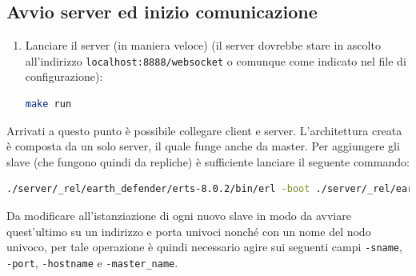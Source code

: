 \documentclass[paper=a4, fontsize=11pt]{scrartcl} %
\numberwithin{equation}{section} %
\numberwithin{figure}{section} %
\numberwithin{table}{section} %
\begin{document}
\subsection{Avvio server ed inizio comunicazione}
\begin{enumerate}
\item
Lanciare il server (in maniera veloce) (il server dovrebbe stare in ascolto all'indirizzo \texttt{localhost:8888/websocket} o comunque come indicato nel file di configurazione):
\begin{lstlisting}[language=bash]
make run
\end{lstlisting}
\end{enumerate}

Arrivati a questo punto è possibile collegare client e server.
L'architettura creata è composta da un solo server, il quale funge anche da master. Per aggiungere gli slave (che fungono quindi da repliche) è sufficiente
lanciare il seguente commando:
\begin{lstlisting}[language=bash]
./server/_rel/earth_defender/erts-8.0.2/bin/erl -boot ./server/_rel/earth_defender/releases/1.0.0/earth_defender -sname 'ketchup' -setcookie 'earth_defender' -port 8889 -hostname "localhost" -role slave -master_name earth_defender@host
\end{lstlisting}
Da modificare all'istanziazione di ogni nuovo slave in modo da avviare quest'ultimo su un indirizzo e porta univoci nonché con un nome del nodo univoco, per tale operazione è quindi necessario agire sui seguenti campi \texttt{-sname}, \texttt{-port}, \texttt{-hostname} e \texttt{-master\_name}.



\end{document}
